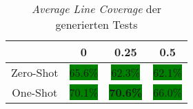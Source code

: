 \bgroup
\def\arraystretch{2}
\begin{table}[H]
	\vspace{.5cm}
	\centering		
	\begin{center}
		\begin{tabular}{|c||c|c|c|}
			\hline 
			& 0 & 0.25 & 0.5 \\
			\hline 
			\hline
			Zero-Shot & \colorbox{green}{65.6\%} & \colorbox{green}{62.3\%} & \colorbox{green}{62.1\%} \\
			\hline
			One-Shot & \colorbox{green}{70.1\%} & \colorbox{green}{\textbf{70.6\%}} & \colorbox{green}{66.0\%} \\
			\hline
		\end{tabular} 
	\end{center}
	\caption{\textit{Average Line Coverage} der generierten Tests}
	\label{fig:line-avg}
	\vspace{-.8cm}
\end{table}
\egroup